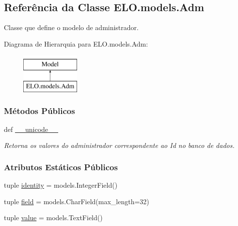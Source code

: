 \hypertarget{classELO_1_1models_1_1Adm}{\subsection{Referência da Classe E\-L\-O.\-models.\-Adm}
\label{classELO_1_1models_1_1Adm}
}


Classe que define o modelo de administrador.  


Diagrama de Hierarquia para E\-L\-O.\-models.\-Adm\-:\begin{figure}[H]
\begin{center}
\leavevmode
\includegraphics[height=2.000000cm]{df/d5e/classELO_1_1models_1_1Adm}
\end{center}
\end{figure}
\subsubsection*{Métodos Públicos}
\begin{DoxyCompactItemize}
\item 
def \hyperlink{classELO_1_1models_1_1Adm_a3541c3ae12b8d2da3f44ac6be00a23e6}{\-\_\-\-\_\-unicode\-\_\-\-\_\-}
\begin{DoxyCompactList}\small\item\em Retorna os valores do administrador correspondente ao Id no banco de dados. \end{DoxyCompactList}\end{DoxyCompactItemize}
\subsubsection*{Atributos Estáticos Públicos}
\begin{DoxyCompactItemize}
\item 
tuple \hyperlink{classELO_1_1models_1_1Adm_af7e7b797ce5d3396e8a54d8927450d75}{identity} = models.\-Integer\-Field()
\item 
tuple \hyperlink{classELO_1_1models_1_1Adm_ae1af4ca22491b1cfe9cb0a7acefaa71e}{field} = models.\-Char\-Field(max\-\_\-length=32)
\item 
tuple \hyperlink{classELO_1_1models_1_1Adm_a98f249c493fbcbcd347297437a098212}{value} = models.\-Text\-Field()
\end{DoxyCompactItemize}


